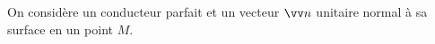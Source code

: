 ﻿\documentclass[a4paper]{article}
\begin{document}
\pagestyle{fancy}
\fancyhf{}
\setlength{\headheight}{15pt}

\begin{center}
	\large{}
\end{center}


On considère un conducteur parfait et un vecteur $\vv n$ unitaire normal à sa surface en un point $M$.\par
{}
\end{document}
